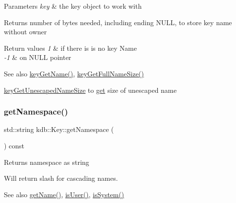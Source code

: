 \begin{DoxyParams}{Parameters}
{\em key} & the key object to work with \\
\hline
\end{DoxyParams}
\begin{DoxyReturn}{Returns}
number of bytes needed, including ending N\+U\+LL, to store key name without owner 
\end{DoxyReturn}

\begin{DoxyRetVals}{Return values}
{\em 1} & if there is is no key Name \\
\hline
{\em -\/1} & on N\+U\+LL pointer \\
\hline
\end{DoxyRetVals}
\begin{DoxySeeAlso}{See also}
\hyperlink{group__keyname_gab29a850168d9b31c9529e90cf9ab68be}{key\+Get\+Name()}, \hyperlink{group__keyname_gab65dc9d43d3ee08d5e936a20ebbddd23}{key\+Get\+Full\+Name\+Size()} 

\hyperlink{group__keyname_ga5e7eff0c77678420199d0d2e8729152b}{key\+Get\+Unescaped\+Name\+Size} to \hyperlink{classkdb_1_1Key_ac558a1f1b2cb50d77fbabcbb24950c05}{get} size of unescaped name 
\end{DoxySeeAlso}
\mbox{\label{classkdb_1_1Key_a71b191c56eacb692c2f92ed440b32b46}} 
\subsubsection{\texorpdfstring{get\+Namespace()}{getNamespace()}}
{\footnotesize\ttfamily std\+::string kdb\+::\+Key\+::get\+Namespace (\begin{DoxyParamCaption}{ }\end{DoxyParamCaption}) const\hspace{0.3cm}{\ttfamily [inline]}}

\begin{DoxyReturn}{Returns}
namespace as string
\end{DoxyReturn}
Will return slash for cascading names.

\begin{DoxySeeAlso}{See also}
\hyperlink{classkdb_1_1Key_a6c1812730e9cb714893c9f9b1e503303}{get\+Name()}, \hyperlink{classkdb_1_1Key_a3b3d0d74246b259b10caed425216d91c}{is\+User()}, \hyperlink{classkdb_1_1Key_a44833fb97b02ca58205c48d740c4cada}{is\+System()} 
\end{DoxySeeAlso}
\mbox{\label{classkdb_1_1Key_ae050f835e06aa0ecb828315e1fdb63ea}} 
